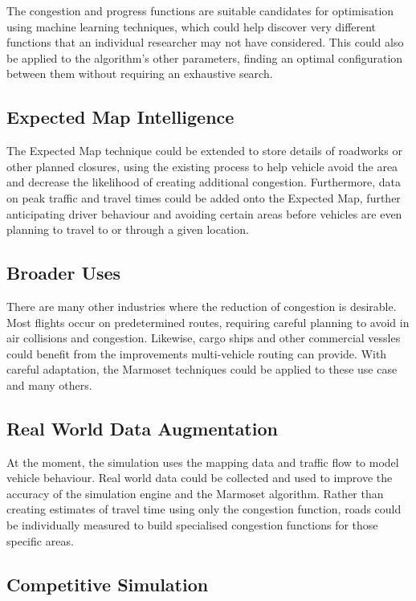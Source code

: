 \documentclass[ %
                    author={Alexander Hill},
                supervisor={Dr. Benjamin Sach},
                    degree={MEng},
                     title={MARMOSET},
                  subtitle={Multi-Agent Route Management using Online Simulation for Efficient Transportation},
                      type={research},
                      year={2016} ]{dissertation}
\begin{document}
The congestion and progress functions are suitable candidates for optimisation
using machine learning techniques, which could help discover very different
functions that an individual researcher may not have considered. This could also
be applied to the algorithm's other parameters, finding an optimal configuration
between them without requiring an exhaustive search.

\subsection*{Expected Map Intelligence}

The Expected Map technique could be extended to store details of roadworks or
other planned closures, using the existing process to help vehicle avoid the
area and decrease the likelihood of creating additional congestion. Furthermore,
data on peak traffic and travel times could be added onto the Expected Map,
further anticipating driver behaviour and avoiding certain areas before vehicles
are even planning to travel to or through a given location.

\subsection*{Broader Uses}

There are many other industries where the reduction of congestion is desirable.
Most flights occur on predetermined routes, requiring careful planning to avoid
in air collisions and congestion. Likewise, cargo ships and other commercial
vessles could benefit from the improvements multi-vehicle routing can provide.
With careful adaptation, the Marmoset techniques could be applied to these use
case and many others.

\subsection*{Real World Data Augmentation}

At the moment, the simulation uses the mapping data and traffic flow to model
vehicle behaviour. Real world data could be collected and used to improve the
accuracy of the simulation engine and the Marmoset algorithm. Rather than
creating estimates of travel time using only the congestion function, roads
could be individually measured to build specialised congestion functions for
those specific areas.

\subsection*{Competitive Simulation}
\end{document}
